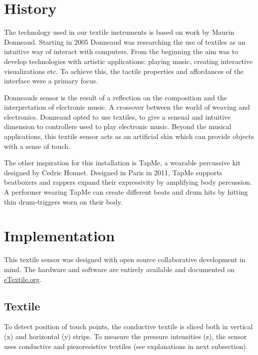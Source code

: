 \documentclass{sigchi-ext}
\begin{document}
\section{History}
The technology used in our textile instruments is based on work by Maurin Donneaud. Starting in 2005 Donneaud was researching the use of textiles as an intuitive way of interact with computers. From the beginning the aim was to develop technologies with artistic applications: playing music, creating interactive visualizations etc. To achieve this, the tactile properties and affordances of the interface were a primary focus. 

Donneauds sensor is the result of a reflection on the composition and the interpretation of electronic music. A crossover between the world of  weaving and electronics. Donneaud opted to use textiles, to give a sensual and intuitive dimension to controllers used to play electronic music.  Beyond the musical applications, this textile sensor acts as an artificial skin which can provide objects with a sense of touch. 

The other inspiration for this installation is TapMe, a wearable percussive kit designed by Cedric Honnet. Designed in Paris in 2011, TapMe supports beatboxers and rappers expand their expressivity by amplifying body percussion. A performer wearing TapMe can create different beats and drum hits by hitting thin drum-triggers worn on their body.












\section{Implementation}

This textile sensor was  designed with open source collaborative development in mind. The hardware and software are entirely available and documented on \url{eTextile.org}.


\subsection{Textile}

To detect position of touch points, the conductive textile is sliced both in vertical (x) and horizontal (y) strips.
To measure the pressure intensities (z), the sensor uses conductive and piezoresistive textiles (see explanations in next subsection).
\end{document}
